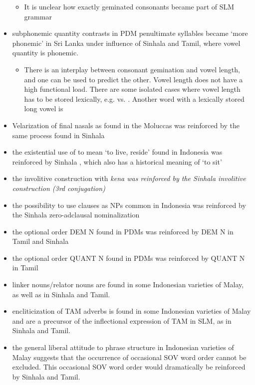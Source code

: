 \documentclass[a4paper,12pt]{article}
\begin{document}
\begin{itemize}
\begin{itemize}
    \item It is unclear how exactly geminated consonants became part of SLM grammar
  \end{itemize}
  \item subphonemic quantity contrasts in PDM penultimate syllables became `more phonemic' in Sri Lanka under influence of Sinhala and Tamil, where vowel quantity is phonemic.
  \begin{itemize}
   \item There is an interplay between consonant gemination and vowel length, and one can be used to predict the other. Vowel length does not have a high functional load. There are some isolated cases where vowel length has to be stored lexically, e.g.  vs. . Another word with a lexically stored long vowel is 
  \end{itemize}
  \item Velarization of final nasals as found in the Moluccas \citep{Adelaar1991,Paauw2004} was reinforced by the same process found in Sinhala
  \item the existential use of  to mean `to live, reside' found in Indonesia was reinforced by Sinhala , which also has a historical meaning of `to sit' \citep{Nordhoff2010ismil}
  \item the involitive construction with \em kena \em was reinforced by the Sinhala involitive construction (3rd conjugation) \citep{Nordhoff2010ismil}
  \item the possibility to use clauses as NPs common in Indonesia was reinforced by the Sinhala zero-adclausal nominalization \citep{Nordhoff2010ismil}
  \item the optional order DEM N found in PDMs was reinforced by DEM N in Tamil and Sinhala \citep{Adelaar1991,Paauw2004,Paauw2008phd}
  \item the optional order QUANT N found in PDMs was reinforced by QUANT N in Tamil  \citep{Adelaar1991,Paauw2004,Paauw2008phd}
  \item linker nouns/relator nouns \citep{Adelaar1991,SmithEtAl2004,Nordhoff2009phd} are found in some Indonesian varieties of Malay\citep{Paauw2004}, as well as in Sinhala and Tamil.
  \item  encliticization of TAM adverbs \citep{Adelaar1991} is found in some Indonesian varieties of Malay and are a precursor of the inflectional expression of TAM in SLM, as in Sinhala and Tamil.
  \item the general liberal attitude to phrase structure in Indonesian varieties of Malay suggests that the occurrence of occasional SOV word order cannot be excluded. This occasional SOV word order would dramatically be reinforced by Sinhala and Tamil.
\end{itemize}    
\end{document}
